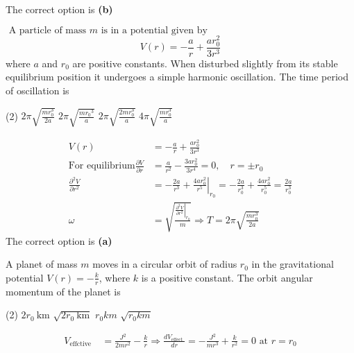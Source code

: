 \begin{enumerate}
\begin{answer}
	The correct option is \textbf{(b)}
\end{answer}
\begin{minipage}{\textwidth}
	\item $\text { A particle of mass } m \text { is in a potential given by }$
	$$V(r)=-\frac{a}{r}+\frac{a r_{0}^{2}}{3 r^{3}}$$
	where $a$ and $r_{0}$ are positive constants. When disturbed slightly from its stable equilibrium position it undergoes a simple harmonic oscillation. The time period of oscillation is
\end{minipage}
\begin{tasks}(2)
	\task[\textbf{A.}] $2 \pi \sqrt{\frac{m r_{0}^{3}}{2 a}}$
	\task[\textbf{B.}]$2 \pi \sqrt{\frac{m r_{0}{ }^{3}}{a}}$
	\task[\textbf{C.}]$2 \pi \sqrt{\frac{2 m r_{0}^{3}}{a}}$
	\task[\textbf{D.}]$4 \pi \sqrt{\frac{m r_{0}^{3}}{a}}$
\end{tasks}
\begin{answer}
	\begin{align*}
	V(r)&=-\frac{a}{r}+\frac{a r_{0}^{2}}{3 r^{3}}\\
	\text{For equilibrium} \frac{\partial V}{\partial r}&=\frac{a}{r^{2}}-\frac{3 a r_{0}^{2}}{3 r^{4}}=0, \quad r=\pm r_{0} \\
	\frac{\partial^{2} V}{\partial r^{2}}&=-\frac{2 a}{r^{3}}+\left.\frac{4 a r_{0}^{2}}{r^{5}}\right|_{r_{0}}=-\frac{2 a}{r_{0}^{3}}+\frac{4 a r_{0}^{2}}{r_{0}^{5}}=\frac{2 a}{r_{0}^{3}}\\
	\omega&=\sqrt{\frac{\left.\frac{\partial^{2} V}{\partial r^{2}}\right|_{r_{0}}}{m}} \Rightarrow T=2 \pi \sqrt{\frac{m r_{0}^{3}}{2 a}}
	\end{align*}
	The correct option is \textbf{(a)}
\end{answer}
\begin{minipage}{\textwidth}
	\item A planet of mass $m$ moves in a circular orbit of radius $r_{0}$ in the gravitational potential $V(r)=-\frac{k}{r}$, where $k$ is a positive constant. The orbit angular momentum of the planet is
\end{minipage}
\begin{tasks}(2)
	\task[\textbf{A.}] $2 r_{0} \mathrm{~km}$
	\task[\textbf{B.}]$\sqrt{2 r_{0} \mathrm{~km}}$
	\task[\textbf{C.}]$r_{0} k m$
	\task[\textbf{D.}]$\sqrt{r_{0} k m}$
\end{tasks}
\begin{answer}
\begin{align*}
	V_{\text {effctive }}&=\frac{J^{2}}{2 m r^{2}}-\frac{k}{r} \Rightarrow \frac{d V_{\text {effect }}}{d r}=-\frac{J^{2}}{m r^{3}}+\frac{k}{r^{2}}=0 \text { at } r=r_{0}\\

\end{align*}
\end{answer}
\end{enumerate}
